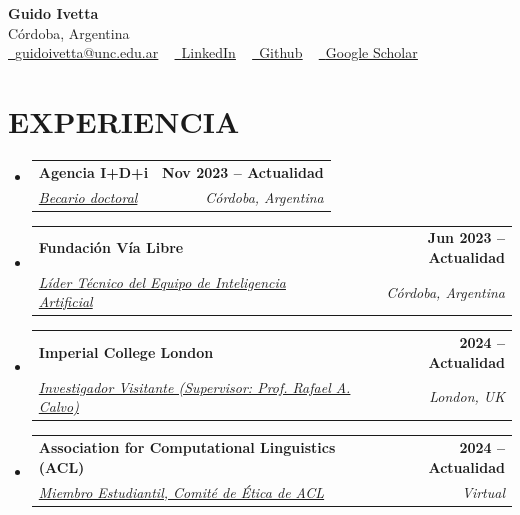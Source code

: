 \documentclass[letterpaper,11pt]{article}
\makeatletter
\newif\ifeng
\newcommand{\lang}[2]{\ifeng #1\else #2\fi}
\newcommand{\resumeSubheading}[4]{
  \vspace{-2pt}\item
    \begin{tabular*}{1.0\textwidth}[t]{l@{\extracolsep{\fill}}r}
      \textbf{\large#1} & \textbf{\small #2} \\
      \textit{\large#3} & \textit{\small #4} \\
    \end{tabular*}\vspace{-7pt}
}
\newcommand{\resumeSubHeadingListStart}{\begin{itemize}[leftmargin=0.0in, label={}]}
\newcommand{\resumeSubHeadingListEnd}{\end{itemize}}
\makeatother
\begin{document}
\begin{center}
    {\Huge \textbf{Guido Ivetta}} \\ \vspace{1pt}
     Córdoba, Argentina \\ \vspace{1pt}
     \href{mailto:guidoivetta@unc.edu.ar}{\raisebox{-0.2\height}\faEnvelope\  \underline{guidoivetta@unc.edu.ar}} ~ 
    \href{https://linkedin.com/in/guidoivetta}{\raisebox{-0.2\height}\faLinkedinSquare\ \underline{LinkedIn}}  ~
    \href{https://github.com/guidoivetta}{\raisebox{-0.2\height}\faGithub\ \underline{Github}} ~
    \href{https://scholar.google.com/citations?user=_QA3Hs4AAAAJ&hl=en&oi=ao}{\raisebox{-0.2\height}\faGraduationCap\ \underline{Google Scholar}}
\end{center}

\section{\lang{EXPERIENCE}{EXPERIENCIA}}
  \resumeSubHeadingListStart
    \resumeSubheading
      {Agencia I+D+i \href{https://www.argentina.gob.ar/jefatura/innovacion-ciencia-y-tecnologia/agencia}{\raisebox{-0.1\height}\faExternalLink }}{Nov 2023 -- \lang{Present}{Actualidad}} 
      {\underline{\lang{Doctoral Fellow}{Becario doctoral}}}{Córdoba, Argentina}
  \resumeSubHeadingListEnd
  \vspace{-5pt}

  \resumeSubHeadingListStart
    \resumeSubheading
      {Fundación Vía Libre \href{https://ia.vialibre.org.ar/}{\raisebox{-0.1\height}\faExternalLink }}{Jun 2023 -- \lang{Present}{Actualidad}} 
      {\underline{\lang{Technical Lead @ Artificial Intelligence Team}{Líder Técnico del Equipo de Inteligencia Artificial}}}{Córdoba, Argentina} 
  \resumeSubHeadingListEnd
  \vspace{-5pt}

  \resumeSubHeadingListStart
    \resumeSubheading
      {Imperial College London \href{https://www.imperial.ac.uk/}{\raisebox{-0.1\height}\faExternalLink }}{2024 -- \lang{Present}{Actualidad}} 
      {\underline{\lang{Visiting Researcher (Advisor: Prof. Rafael A. Calvo)}{Investigador Visitante (Supervisor: Prof. Rafael A. Calvo)}}}{London, UK} 
  \resumeSubHeadingListEnd
  \vspace{-5pt}

  \resumeSubHeadingListStart
    \resumeSubheading
      {Association for Computational Linguistics (ACL) \href{https://www.aclweb.org/}{\raisebox{-0.1\height}\faExternalLink }}{2024 -- \lang{Present}{Actualidad}} 
      {\underline{\lang{Student Member, ACL Ethics Committee}{Miembro Estudiantil, Comité de Ética de ACL}}}{Virtual} 
  \resumeSubHeadingListEnd
  \vspace{-5pt}
  
\end{document}
